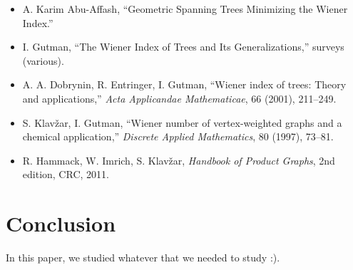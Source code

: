 \documentclass{article}
\begin{document}
\begin{itemize}
	\item A. Karim Abu-Affash, ``Geometric Spanning Trees Minimizing the Wiener Index.''
	\item I. Gutman, ``The Wiener Index of Trees and Its Generalizations,'' surveys (various).
	\item A. A. Dobrynin, R. Entringer, I. Gutman, ``Wiener index of trees: Theory and applications,'' \emph{Acta Applicandae Mathematicae}, 66 (2001), 211--249.
	\item S. Klav\v{z}ar, I. Gutman, ``Wiener number of vertex-weighted graphs and a chemical application,'' \emph{Discrete Applied Mathematics}, 80 (1997), 73--81.
	\item R. Hammack, W. Imrich, S. Klav\v{z}ar, \emph{Handbook of Product Graphs}, 2nd edition, CRC, 2011.
\end{itemize}

\section{Conclusion}
In this paper, we studied whatever that we needed to study :).




\end{document}
